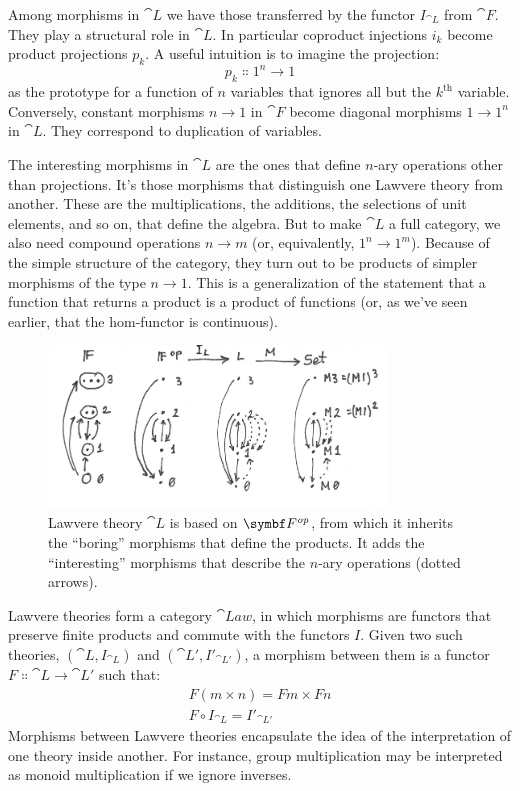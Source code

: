 Among morphisms in $\cat{L}$ we have those transferred by the functor
$I_{\cat{L}}$ from $\cat{F}$. They play a structural role in $\cat{L}$. In
particular coproduct injections $i_k$ become product projections
$p_k$. A useful intuition is to imagine the projection:
\[p_k \Colon 1^n \to 1\]
as the prototype for a function of $n$ variables that ignores all but the
$k^\text{th}$ variable. Conversely, constant morphisms $n \to 1$
in $\cat{F}$ become diagonal morphisms $1 \to 1^n$ in
$\cat{L}$. They correspond to duplication of variables.

The interesting morphisms in $\cat{L}$ are the ones that define $n$-ary
operations other than projections. It's those morphisms that distinguish
one Lawvere theory from another. These are the multiplications, the
additions, the selections of unit elements, and so on, that define the
algebra. But to make $\cat{L}$ a full category, we also need compound
operations $n \to m$ (or, equivalently,
$1^n \to 1^m$). Because of the simple structure of
the category, they turn out to be products of simpler morphisms of the
type $n \to 1$. This is a generalization of the
statement that a function that returns a product is a product of
functions (or, as we've seen earlier, that the hom-functor is
continuous).

\begin{figure}[H]
  \centering
  \includegraphics[width=0.8\textwidth]{images/lawvere1.png}
  \caption{Lawvere theory $\cat{L}$ is based on $\Fop$, from which
    it inherits the ``boring'' morphisms that define the products. It adds
    the ``interesting'' morphisms that describe the $n$-ary operations (dotted
    arrows).}
\end{figure}

Lawvere theories form a category $\cat{Law}$, in which morphisms are
functors that preserve finite products and commute with the functors
$I$. Given two such theories, $(\cat{L}, I_{\cat{L}})$ and
$(\cat{L'}, I'_{\cat{L'}})$, a morphism between them is a
functor $F \Colon \cat{L} \to \cat{L'}$ such that:
\begin{gather*}
  F (m \times n) = F m \times F n \\
  F \circ I_{\cat{L}} = I'_{\cat{L'}}
\end{gather*}
Morphisms between Lawvere theories encapsulate the idea of the
interpretation of one theory inside another. For instance, group
multiplication may be interpreted as monoid multiplication if we ignore
inverses.

